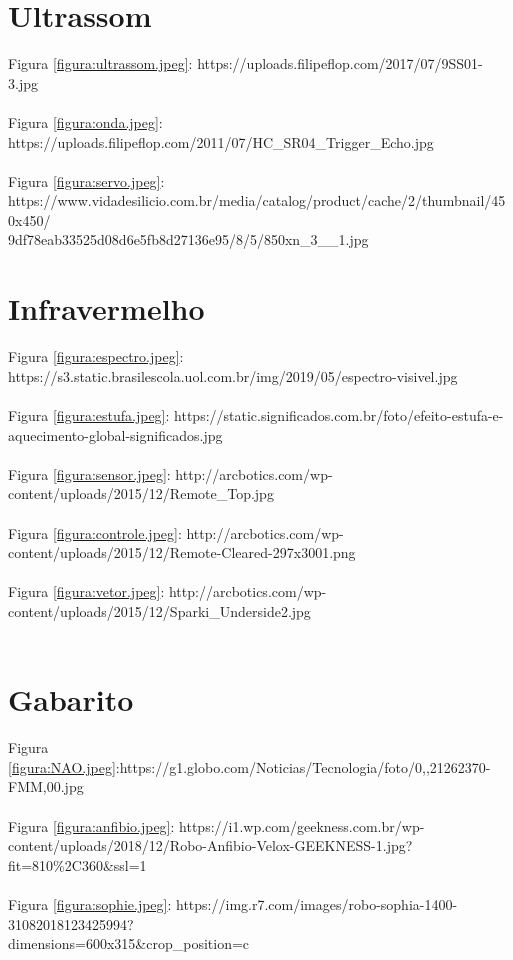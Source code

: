 \section*{Ultrassom}

\noindent Figura \ref{figura:ultrassom.jpeg}: https://uploads.filipeflop.com/2017/07/9SS01-3.jpg
\\~\\
Figura \ref{figura:onda.jpeg}: https://uploads.filipeflop.com/2011/07/HC\_SR04\_Trigger\_Echo.jpg
\\~\\
Figura \ref{figura:servo.jpeg}: https://www.vidadesilicio.com.br/media/catalog/product/cache/2/thumbnail/450x450/\\9df78eab33525d08d6e5fb8d27136e95/8/5/850xn\_3\_\_1.jpg

\section*{Infravermelho}

\noindent Figura \ref{figura:espectro.jpeg}: https://s3.static.brasilescola.uol.com.br/img/2019/05/espectro-visivel.jpg
\\~\\
Figura \ref{figura:estufa.jpeg}: https://static.significados.com.br/foto/efeito-estufa-e-aquecimento-global-significados.jpg
\\~\\
Figura \ref{figura:sensor.jpeg}: http://arcbotics.com/wp-content/uploads/2015/12/Remote\_Top.jpg
\\~\\
Figura \ref{figura:controle.jpeg}: http://arcbotics.com/wp-content/uploads/2015/12/Remote-Cleared-297x3001.png
\\~\\
Figura \ref{figura:vetor.jpeg}: http://arcbotics.com/wp-content/uploads/2015/12/Sparki\_Underside2.jpg
\\~\\

\section*{Gabarito}

\noindent Figura \ref{figura:NAO.jpeg}:https://g1.globo.com/Noticias/Tecnologia/foto/0,,21262370-FMM,00.jpg 
\\~\\
Figura \ref{figura:anfibio.jpeg}: https://i1.wp.com/geekness.com.br/wp-content/uploads/2018/12/Robo-Anfibio-Velox-GEEKNESS-1.jpg?fit=810\%2C360\&ssl=1
\\~\\
Figura \ref{figura:sophie.jpeg}: https://img.r7.com/images/robo-sophia-1400-31082018123425994?\\dimensions=600x315\&crop\_position=c

